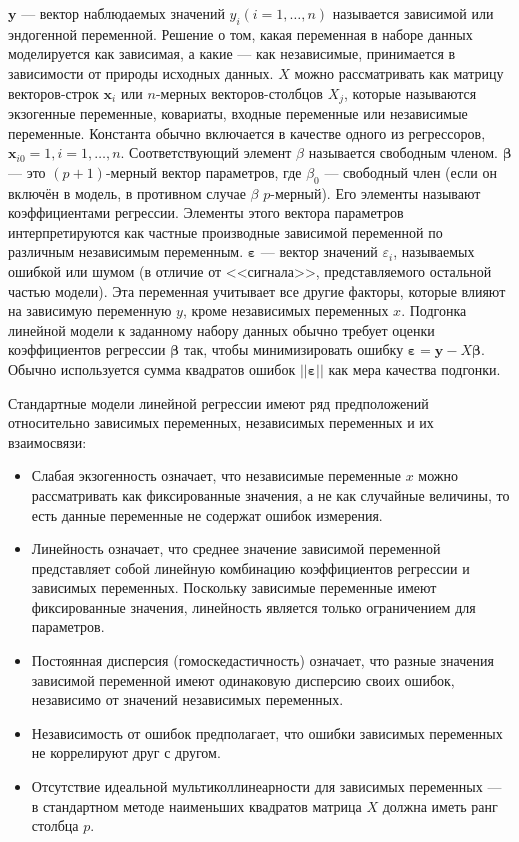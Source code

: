 $\mathbf{y}$ --- вектор наблюдаемых значений $y_{i}\left(i = 1, \ldots, n\right)$ называется зависимой или эндогенной переменной. Решение о том, какая переменная в наборе данных моделируется как зависимая, а какие --- как независимые, принимается в зависимости от природы исходных данных. $X$ можно рассматривать как матрицу векторов-строк $\mathbf{x}_{i}$ или $n$-мерных векторов-столбцов $X_{j}$, которые называются экзогенные переменные, ковариаты, входные переменные или независимые переменные. Константа обычно включается в качестве одного из регрессоров, $\mathbf{x}_{i0} = 1, i = 1, \ldots, n$. Соответствующий элемент $\beta$ называется свободным членом. $\boldsymbol{\beta}$ --- это $(p + 1)$-мерный вектор параметров, где $\beta_{0}$ --- свободный член (если он включён в модель, в противном случае ${\beta}$ $p$-мерный). Его элементы называют коэффициентами регрессии. Элементы этого вектора параметров интерпретируются как частные производные зависимой переменной по различным независимым переменным. ${\boldsymbol{\varepsilon}}$ --- вектор значений $\varepsilon_{i}$, называемых ошибкой или шумом (в отличие от <<сигнала>>, представляемого остальной частью модели). Эта переменная учитывает все другие факторы, которые влияют на зависимую переменную $y$, кроме независимых переменных $x$.
Подгонка линейной модели к заданному набору данных обычно требует оценки коэффициентов регрессии ${\boldsymbol{\beta}}$ так, чтобы минимизировать ошибку ${\boldsymbol{\varepsilon}} = \mathbf{y} - X{\boldsymbol{\beta}}$. Обычно используется сумма квадратов ошибок $||{\boldsymbol{\varepsilon}}||$ как мера качества подгонки.

Стандартные модели линейной регрессии имеют ряд предположений относительно зависимых переменных, независимых переменных и их взаимосвязи:
\begin{itemize}
	\item Слабая экзогенность означает, что независимые переменные $x$ можно рассматривать как фиксированные значения, а не как случайные величины, то есть данные переменные не содержат ошибок измерения. 
	\item Линейность означает, что среднее значение зависимой переменной представляет собой линейную комбинацию коэффициентов регрессии и зависимых переменных. Поскольку зависимые переменные имеют фиксированные значения, линейность является только ограничением для параметров. 
	\item Постоянная дисперсия (гомоскедастичность) означает, что разные значения зависимой переменной имеют одинаковую дисперсию своих ошибок, независимо от значений независимых переменных. 
	\item Независимость от ошибок предполагает, что ошибки зависимых переменных не коррелируют друг с другом. 
	\item Отсутствие идеальной мультиколлинеарности для зависимых переменных --- в стандартном методе наименьших квадратов матрица $X$ должна иметь ранг столбца $p$. 
\end{itemize}

